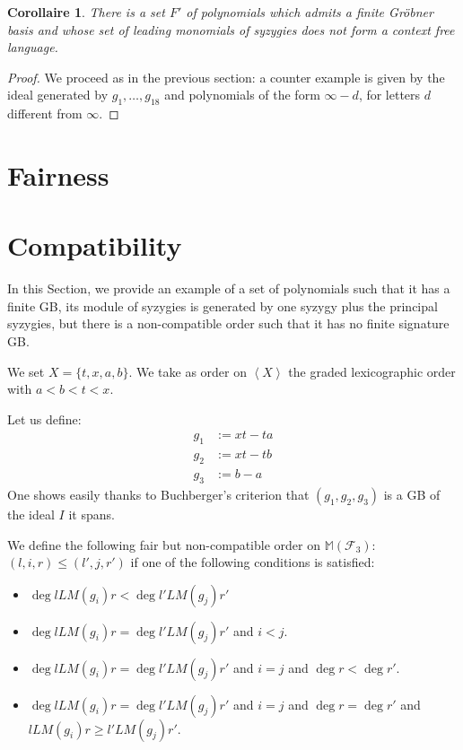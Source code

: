 \documentclass[sigconf]{acmart}
\theoremstyle{plain}
\newtheorem{cor}[lem]{Corollaire}
\theoremstyle{definition}
\theoremstyle{remark}
\newcommand{\MM}{\mathbb M}
\newcommand{\LM}{LM}
\begin{document}
\begin{cor}
There is a set $F'$ of polynomials which
admits a finite Gröbner basis
and whose set of leading monomials of syzygies does not form a context free language. 
\end{cor}
\begin{proof}
  We proceed as in the previous section: a counter example is given by the ideal
  generated by $g_1,\dots,g_{18}$ and polynomials of the form $\infty-d$, for letters
  $d$ different from $\infty$.
\end{proof}


\section{Fairness}

\section{Compatibility}

In this Section,
we provide an example
of a set of polynomials
such that 
it has a finite GB,
its module of
syzygies is generated
by one syzygy plus
the principal syzygies,
but there is
a non-compatible order
such that it
has no finite signature GB.

We set $X = \{t, x, a, b \}$.
We take as order on 
$\left\langle X \right\rangle$ the 
graded lexicographic order
with $a < b < t < x$.

Let us define:
\begin{align*}
	g_1 &:= xt - ta \\
	g_2 &:= xt - tb \\
	g_3 &:= b - a
\end{align*}
One shows easily
thanks to Buchberger's criterion
that $(g_1,g_2,g_3)$
is a GB of the ideal $I$ it spans.

We define the following
fair but non-compatible order
on $\MM \left( \mathscr{F}_3 \right):$
  $(l, i, r) \leq (l', j, r')$ if one of the following
  conditions is satisfied:
\begin{itemize}
	\item $\deg{l\LM(g_i)r} < \deg{l'\LM(g_j)r'}$
	\item $\deg{l\LM(g_i)r} = \deg{l'\LM(g_j)r'}$ and $i < j$.
	\item $\deg{l\LM(g_i)r} = \deg{l'\LM(g_j)r'}$ and $i = j$ and $\deg{r} < \deg{r'}$.
	\item $\deg{l\LM(g_i)r} = \deg{l'\LM(g_j)r'}$ and $i = j$ and $\deg{r} = \deg{r'}$ and $l\LM(g_i)r \geq l'\LM(g_j)r'$.
\end{itemize}
\end{document}
